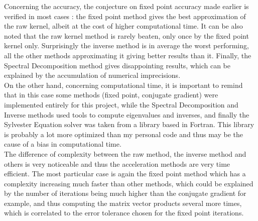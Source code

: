 \documentclass{article}
\theoremstyle{definition}
\begin{document}
Concerning the accuracy, the conjecture on fixed point accuracy made earlier is verified in most cases : the fixed point method gives the best approximation of the raw kernel, albeit at the cost of higher computational time. It can be also noted that the raw kernel method is rarely beaten, only once by the fixed point kernel only. Surprisingly the inverse method is in average the worst performing, all the other methods approximating it giving better results than it. Finally, the Spectral Decomposition method gives disappointing results, which can be explained by the accumulation of numerical imprecisions.\\
On the other hand, concerning computational time, it is important to remind that in this case some methods (fixed point, conjugate gradient) were implemented entirely for this project, while the Spectral Decomposition and Inverse methods used tools to compute eigenvalues and inverses, and finally the Sylvester Equation solver was taken from a library based in Fortran. This library is probably a lot more optimized than my personal code and thus may be the cause of a bias in computational time.\\
The difference of complexity between the raw method, the inverse method and others is very noticeable and thus the acceleration methods are very time efficient. The most particular case is again the fixed point method which has a complexity increasing much faster than other methods, which could be explained by the number of iterations being much higher than the conjugate gradient for example, and thus computing the matrix vector products several more times, which is correlated to the error tolerance chosen for the fixed point iterations.
\end{document}
